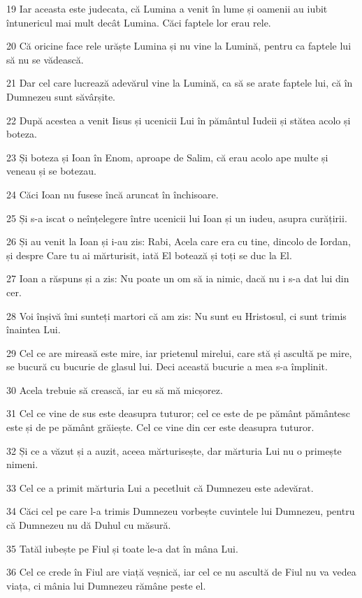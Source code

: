 \par 19 Iar aceasta este judecata, că Lumina a venit în lume și oamenii au iubit întunericul mai mult decât Lumina. Căci faptele lor erau rele.
\par 20 Că oricine face rele urăște Lumina și nu vine la Lumină, pentru ca faptele lui să nu se vădească.
\par 21 Dar cel care lucrează adevărul vine la Lumină, ca să se arate faptele lui, că în Dumnezeu sunt săvârșite.
\par 22 După acestea a venit Iisus și ucenicii Lui în pământul Iudeii și stătea acolo și boteza.
\par 23 Și boteza și Ioan în Enom, aproape de Salim, că erau acolo ape multe și veneau și se botezau.
\par 24 Căci Ioan nu fusese încă aruncat în închisoare.
\par 25 Și s-a iscat o neînțelegere între ucenicii lui Ioan și un iudeu, asupra curățirii.
\par 26 Și au venit la Ioan și i-au zis: Rabi, Acela care era cu tine, dincolo de Iordan, și despre Care tu ai mărturisit, iată El botează și toți se duc la El.
\par 27 Ioan a răspuns și a zis: Nu poate un om să ia nimic, dacă nu i s-a dat lui din cer.
\par 28 Voi înșivă îmi sunteți martori că am zis: Nu sunt eu Hristosul, ci sunt trimis înaintea Lui.
\par 29 Cel ce are mireasă este mire, iar prietenul mirelui, care stă și ascultă pe mire, se bucură cu bucurie de glasul lui. Deci această bucurie a mea s-a împlinit.
\par 30 Acela trebuie să crească, iar eu să mă micșorez.
\par 31 Cel ce vine de sus este deasupra tuturor; cel ce este de pe pământ pământesc este și de pe pământ grăiește. Cel ce vine din cer este deasupra tuturor.
\par 32 Și ce a văzut și a auzit, aceea mărturisește, dar mărturia Lui nu o primește nimeni.
\par 33 Cel ce a primit mărturia Lui a pecetluit că Dumnezeu este adevărat.
\par 34 Căci cel pe care l-a trimis Dumnezeu vorbește cuvintele lui Dumnezeu, pentru că Dumnezeu nu dă Duhul cu măsură.
\par 35 Tatăl iubește pe Fiul și toate le-a dat în mâna Lui.
\par 36 Cel ce crede în Fiul are viață veșnică, iar cel ce nu ascultă de Fiul nu va vedea viața, ci mânia lui Dumnezeu rămâne peste el.

